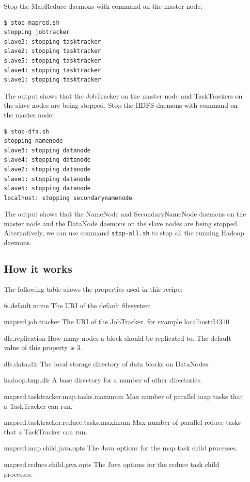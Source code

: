 Stop the MapReduce daemons with command on the master node:
\lstset{style=bashstyle}
\begin{lstlisting}[caption=Stopping the MapReduce cluster]
$ stop-mapred.sh
stopping jobtracker
slave3: stopping tasktracker
slave2: stopping tasktracker
slave5: stopping tasktracker
slave4: stopping tasktracker
slave1: stopping tasktracker
\end{lstlisting}

The output shows that the JobTracker on the master node and TaskTrackers on the slave nodes are being stopped.
Stop the HDFS daemons with command on the master node:
\lstset{style=bashstyle}
\begin{lstlisting}[caption=Stopping the HDFS cluster.]
$ stop-dfs.sh
stopping namenode
slave3: stopping datanode
slave4: stopping datanode
slave2: stopping datanode
slave1: stopping datanode
slave5: stopping datanode
localhost: stopping secondarynamenode
\end{lstlisting}

The output shows that the NameNode and SecondaryNameNode daemons on the master node and the DataNode daemons on the slave nodes are being stopped. Alternatively, we can use command \verb|stop-all.sh| to stop all the running Hadoop daemons.

\subsection*{How it works}
The following table shows the properties used in this recipe:
\begin{description}
    \item{fs.default.name} The URI of the default filesystem.
    \item{mapred.job.tracker} The URI of the JobTracker, for example localhost:54310
    \item{dfs.replication} How many nodes a block should be replicated to. The default value of this property is 3.
    \item{dfs.data.dir} The local storage directory of data blocks on DataNodes.
    \item{hadoop.tmp.dir} A base directory for a number of other directories.
    \item{mapred.tasktracker.map.tasks.maximum} Max number of parallel map tasks that a TaskTracker can run.
    \item{mapred.tasktracker.reduce.tasks.maximum} Max number of parallel reduce tasks that a TaskTracker can run.
    \item{mapred.map.child.java.opts} The Java options for the map task child processes.
    \item{mapred.reduce.child.java.opts} The Java options for the reduce task child processes.
\end{description}

